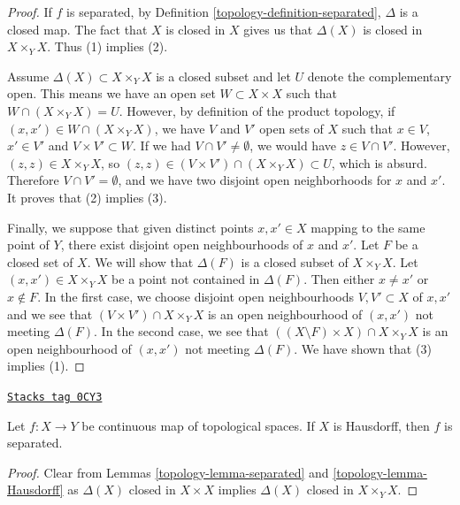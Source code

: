 \begin{proof}

If $f$ is separated, by Definition \ref{topology-definition-separated}, $\Delta$ is a
closed map. The fact that $X$ is closed in $X$ gives us that $\Delta(X)$ is
closed in $ X\times_Y X $. Thus (1) implies (2).

\medskip\noindent
Assume $\Delta(X) \subset X \times_Y X$ is a closed subset and let $U$
denote the complementary open. This means we have an open set
$W \subset X \times X$ such that $W \cap (X \times_Y X) = U$. However,
by definition of the product topology, if
$(x, x') \in W \cap (X \times_Y X)$,
we have $V$ and $V'$ open sets of $X$ such that $x \in V$, $x' \in V'$ and
$V \times V' \subset W$. If we had $V \cap V' \neq \emptyset$, we would have
$z \in V \cap V'$. However, $(z, z) \in X \times_Y X$, so
$(z,z) \in (V \times V') \cap (X\times_Y X) \subset U$, which is absurd.
Therefore $V \cap V' = \emptyset $, and we have two disjoint open
neighborhoods for $x$ and $x'$. It proves that (2) implies (3).

\medskip\noindent
Finally, we suppose that given distinct points $x, x' \in X$ mapping to
the same point of $Y$, there exist disjoint open neighbourhoods
of $x$ and $x'$. Let $F$ be a closed set of $X$. We will show that
$\Delta(F)$ is a closed subset of $X \times_Y X$. Let
$(x, x') \in X \times_Y X$ be a point not contained in $\Delta(F)$.
Then either $x \not = x'$ or $x \not \in F$.
In the first case, we choose disjoint open neighbourhoods
$V, V' \subset X$ of $x, x'$ and we see that $(V \times V') \cap X \times_Y X$
is an open neighbourhood of $(x, x')$ not meeting $\Delta(F)$.
In the second case, we see that $((X \setminus F) \times X) \cap X \times_Y X$
is an open neighbourhood of $(x, x')$ not meeting $\Delta(F)$.
We have shown that (3) implies (1).
\end{proof}

\begin{lemma}
\label{topology-lemma-from-hausdorff}
\href{https://stacks.math.columbia.edu/tag/0CY3}{\texttt{Stacks tag 0CY3}}

Let $f : X \to Y$ be continuous map of topological spaces.
If $X$ is Hausdorff, then $f$ is separated.
\end{lemma}

\begin{proof}

Clear from Lemmas \ref{topology-lemma-separated} and \ref{topology-lemma-Hausdorff}
as $\Delta(X)$ closed in $X \times X$ implies $\Delta(X)$ closed
in $X \times_Y X$.
\end{proof}

